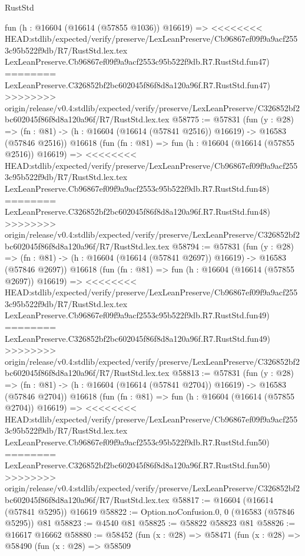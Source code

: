 \begin{lexlean}{RustStd}
\begin{coremodule}
{\begin{coremodule}
{{{{{{{{{{{{{{{{{{{{{{{{{{{{{{{{{{{{{{{{{{{{{{{{{{{{{{{    fun (h : @16604 (@16614 (@57855 @1036)) @16619) =>
<<<<<<<< HEAD:stdlib/expected/verify/preserve/LexLeanPreserve/Cb96867ef09f9a9acf2553c95b522f9db/R7/RustStd.lex.tex
    LexLeanPreserve.Cb96867ef09f9a9acf2553c95b522f9db.R7.RustStd.fun47)
========
    LexLeanPreserve.C326852bf2bc602045f86f8d8a120a96f.R7.RustStd.fun47)
>>>>>>>> origin/release/v0.4:stdlib/expected/verify/preserve/LexLeanPreserve/C326852bf2bc602045f86f8d8a120a96f/R7/RustStd.lex.tex
@58775 := @57831
    (fun (y : @28) =>
    (fn : @81) -> (h : @16604 (@16614 (@57841 @2516)) @16619) -> @16583 (@57846 @2516))
    @16618
    (fun (fn : @81) =>
    fun (h : @16604 (@16614 (@57855 @2516)) @16619) =>
<<<<<<<< HEAD:stdlib/expected/verify/preserve/LexLeanPreserve/Cb96867ef09f9a9acf2553c95b522f9db/R7/RustStd.lex.tex
    LexLeanPreserve.Cb96867ef09f9a9acf2553c95b522f9db.R7.RustStd.fun48)
========
    LexLeanPreserve.C326852bf2bc602045f86f8d8a120a96f.R7.RustStd.fun48)
>>>>>>>> origin/release/v0.4:stdlib/expected/verify/preserve/LexLeanPreserve/C326852bf2bc602045f86f8d8a120a96f/R7/RustStd.lex.tex
@58794 := @57831
    (fun (y : @28) =>
    (fn : @81) -> (h : @16604 (@16614 (@57841 @2697)) @16619) -> @16583 (@57846 @2697))
    @16618
    (fun (fn : @81) =>
    fun (h : @16604 (@16614 (@57855 @2697)) @16619) =>
<<<<<<<< HEAD:stdlib/expected/verify/preserve/LexLeanPreserve/Cb96867ef09f9a9acf2553c95b522f9db/R7/RustStd.lex.tex
    LexLeanPreserve.Cb96867ef09f9a9acf2553c95b522f9db.R7.RustStd.fun49)
========
    LexLeanPreserve.C326852bf2bc602045f86f8d8a120a96f.R7.RustStd.fun49)
>>>>>>>> origin/release/v0.4:stdlib/expected/verify/preserve/LexLeanPreserve/C326852bf2bc602045f86f8d8a120a96f/R7/RustStd.lex.tex
@58813 := @57831
    (fun (y : @28) =>
    (fn : @81) -> (h : @16604 (@16614 (@57841 @2704)) @16619) -> @16583 (@57846 @2704))
    @16618
    (fun (fn : @81) =>
    fun (h : @16604 (@16614 (@57855 @2704)) @16619) =>
<<<<<<<< HEAD:stdlib/expected/verify/preserve/LexLeanPreserve/Cb96867ef09f9a9acf2553c95b522f9db/R7/RustStd.lex.tex
    LexLeanPreserve.Cb96867ef09f9a9acf2553c95b522f9db.R7.RustStd.fun50)
========
    LexLeanPreserve.C326852bf2bc602045f86f8d8a120a96f.R7.RustStd.fun50)
>>>>>>>> origin/release/v0.4:stdlib/expected/verify/preserve/LexLeanPreserve/C326852bf2bc602045f86f8d8a120a96f/R7/RustStd.lex.tex
@58817 := @16604 (@16614 (@57841 @5295)) @16619
@58822 := Option.noConfusion.{0, 0} (@16583 (@57846 @5295)) @81
@58823 := @4540 @81
@58825 := @58822 @58823 @81
@58826 := @16617 @16662
@58880 := @58452
    (fun (x : @28) =>
    @58471
      (fun (x : @28) =>
      @58490
        (fun (x : @28) =>
        @58509
}}}}}}}}}}}}}}}}}}}}}}}}}}}}}}}}}}}}}}}}}}}}}}}}}}}}}}}
\end{coremodule}}
\end{coremodule}
\end{lexlean}
